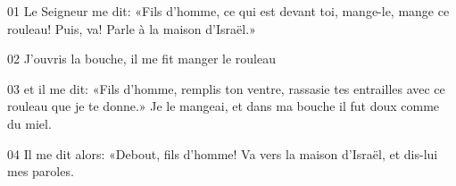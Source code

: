 01 Le Seigneur me dit: «Fils d’homme, ce qui est devant toi, mange-le, mange ce rouleau! Puis, va! Parle à la maison d’Israël.»

02 J’ouvris la bouche, il me fit manger le rouleau

03 et il me dit: «Fils d’homme, remplis ton ventre, rassasie tes entrailles avec ce rouleau que je te donne.» Je le mangeai, et dans ma bouche il fut doux comme du miel.

04 Il me dit alors: «Debout, fils d’homme! Va vers la maison d’Israël, et dis-lui mes paroles.
